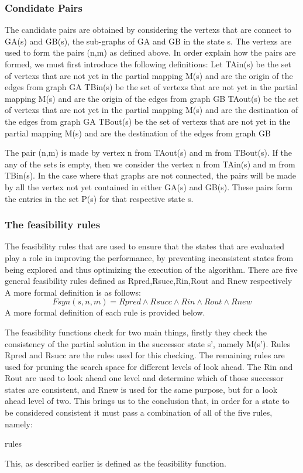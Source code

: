  \subsubsection{Condidate Pairs}
 The candidate pairs are obtained by considering the vertexs that are connect to G{\tiny A}(s) and G{\tiny B}(s), the sub-graphs of G{\tiny A} and G{\tiny B} in the state s. The vertexs are used to form the pairs (n,m) as defined above. In order explain how the pairs are formed, we must first introduce the following definitions:
Let T{\tiny A}in(s) be the set of vertexs that are not yet in the partial mapping M(s) and are the origin of the edges from graph G{\tiny A}
	T{\tiny B}in(s) be the set of vertexs that are not yet in the partial mapping M(s) and are the origin of the edges from graph G{\tiny B}
	T{\tiny A}out(s) be the set of vertexs that are not yet in the partial mapping M(s) and are the destination of the edges from graph G{\tiny A}
	T{\tiny B}out(s) be the set of vertexs that are not yet in the partial mapping M(s) and are the destination of the edges from graph G{\tiny B}
	
The pair (n,m) is made by vertex n from T{\tiny A}out(s) and m from T{\tiny B}out(s). If the any of the sets is empty, then we consider the vertex n from T{\tiny A}in(s) and m from T{\tiny B}in(s). In the case where that graphs are not connected, the pairs will be made by all the vertex not yet contained in either G{\tiny A}(s) and G{\tiny B}(s). These pairs form the entries in the set P(s) for that respective state s.

\subsubsection{The feasibility rules}
The feasibility rules that are used to ensure that the states that are evaluated play a role in improving the performance, by preventing inconsistent states from being explored and thus optimizing the execution of the algorithm. There are five general feasibility rules defined as R{\tiny pred},R{\tiny succ},R{\tiny in},R{\tiny out} and R{\tiny new} respectively A more formal definition is as follows:
	\begin{equation}
		Fsyn(s,n,m) = Rpred \wedge Rsucc \wedge Rin \wedge Rout \wedge Rnew 
	\end{equation} 
 A more formal definition of each rule is provided below.

The feasibility functions check for two main things, firstly they check the consistency of the partial solution in the successor state s', namely M(s'). Rules R{\tiny pred} and R{\tiny succ} are the rules used for this checking.
The remaining rules are used for pruning the search space for different levels of look ahead. The R{\tiny in} and R{\tiny out} are used to look ahead one level and determine which of those successor states are consistent, and R{\tiny new} is used for the same purpose, but for a look ahead level of two. This brings us to the conclusion that, in order for a state to be considered consistent it must pass a combination of all of the five rules, namely:


{rules}


This, as described earlier is defined as the feasibility function.